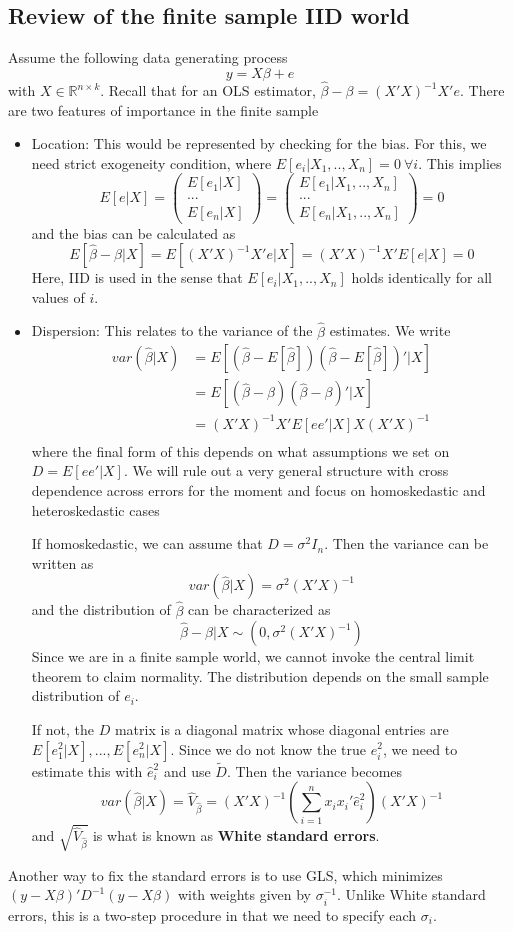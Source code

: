 \documentclass[12pt]{article}
\theoremstyle{definition}
\theoremstyle{property}
\theoremstyle{assumption}
\theoremstyle{example}
\theoremstyle{comment}
\begin{document}
\subsection{Review of the finite sample IID world}
Assume the following data generating process
\[
y=X\beta+e
\]
with $X\in\mathbb{R}^{n\times k}$. Recall that for an OLS estimator, $\hat{\beta}-\beta=(X'X)^{-1}X'e$. There are two features of importance in the finite sample
\begin{itemize}
\item Location: This would be represented by checking for the bias. For this, we need strict exogeneity condition, where $ E[e_i |X_1,..,X_n]=0\ \forall  i$. This implies
\[
E[e|X] = \begin{pmatrix}E[e_1|X] \\ ... \\ E[e_n |X] \end{pmatrix}=\begin{pmatrix}E[e_1|X_1,..,X_n] \\ ... \\ E[e_n |X_1,..,X_n] \end{pmatrix}=0
\]
and the bias can be calculated as
\[
E[\hat{\beta}-\beta|X]=E[(X'X)^{-1}X'e|X]=(X'X)^{-1}X'E[e|X]=0
\]
Here, IID is used in the sense that $E[e_i |X_1,..,X_n]$ holds identically for all values of $i$. 
\item Dispersion: This relates to the variance of the $\hat{\beta}$ estimates. We write
\[
\begin{aligned}
var(\hat{\beta}|X)&=E[(\hat{\beta}-E[\hat{\beta}])(\hat{\beta}-E[\hat{\beta}])'|X]\\
&=E[(\hat{\beta}-\beta)(\hat{\beta}-\beta)'|X]\\
&=(X'X)^{-1}X'E[ee'|X]X(X'X)^{-1}\\
\end{aligned}
\]
where the final form of this depends on what assumptions we set on $D=E[ee'|X]$. We will rule out a very general structure with cross dependence across errors for the moment and focus on homoskedastic and heteroskedastic cases
\par
If homoskedastic, we can assume that $D=\sigma^2 I_n$. Then the variance can be written as
\[
var(\hat{\beta}|X)=\sigma^2(X'X)^{-1}
\]
and the distribution of $\hat{\beta}$ can be characterized as
\[
\hat{\beta}-\beta|X \sim (0, \sigma^2(X'X)^{-1})
\]
Since we are in a finite sample world, we cannot invoke the central limit theorem to claim normality. The distribution depends on the small sample distribution of $e_i$.
\par
If not, the $D$ matrix is a diagonal matrix whose diagonal entries are $E[e_1^2|X],...,E[e_n^2|X]$. Since we do not know the true $e_i^2$, we need to estimate this with $\hat{e}_i^2$ and use $\widetilde{D}$. Then the variance becomes
\[
var(\hat{\beta}|X)=\widehat{V}_{\hat{\beta}}=(X'X)^{-1}\left(\sum_{i=1}^n x_ix_i'\hat{e}_i^2\right)(X'X)^{-1}
\]
and $\sqrt{\widehat{V}_{\hat{\beta}}}$ is what is known as \textbf{White standard errors}. 
\end{itemize}
Another way to fix the standard errors is to use GLS, which minimizes $(y-X\beta)'D^{-1}(y-X\beta)$ with weights given by $\sigma_i^{-1}$. Unlike White standard errors, this is a two-step procedure in that we need to specify each $\sigma_i$.
\end{document}

